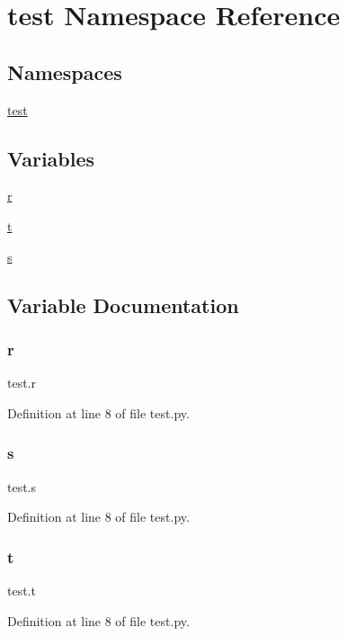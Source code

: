 \hypertarget{namespacetest}{}\section{test Namespace Reference}
\label{namespacetest}
\subsection*{Namespaces}
\begin{DoxyCompactItemize}
\item 
 \hyperlink{namespacetest_1_1test}{test}
\end{DoxyCompactItemize}
\subsection*{Variables}
\begin{DoxyCompactItemize}
\item 
\hyperlink{namespacetest_ac1f92ca15306aee561188e0f37aabc66}{r}
\item 
\hyperlink{namespacetest_ae9ebdaf735944736b55d720cfe9c3e02}{t}
\item 
\hyperlink{namespacetest_a91a88df52e09e64ff8cc9e5d8277c8d4}{s}
\end{DoxyCompactItemize}


\subsection{Variable Documentation}
\mbox{\label{namespacetest_ac1f92ca15306aee561188e0f37aabc66}} 
\subsubsection{\texorpdfstring{r}{r}}
{\footnotesize\ttfamily test.\+r}



Definition at line 8 of file test.\+py.

\mbox{\label{namespacetest_a91a88df52e09e64ff8cc9e5d8277c8d4}} 
\subsubsection{\texorpdfstring{s}{s}}
{\footnotesize\ttfamily test.\+s}



Definition at line 8 of file test.\+py.

\mbox{\label{namespacetest_ae9ebdaf735944736b55d720cfe9c3e02}} 
\subsubsection{\texorpdfstring{t}{t}}
{\footnotesize\ttfamily test.\+t}



Definition at line 8 of file test.\+py.

